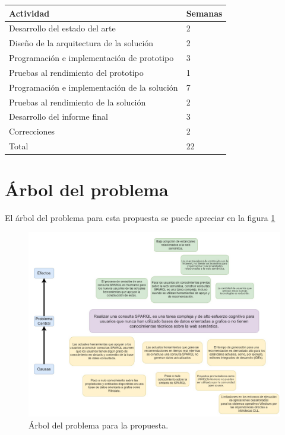 \documentclass[conference,compsoc]{IEEEtran}
\begin{document}
\begin{table}[h]
    \centering
    \begin{tabular}{|l|l|}
        \hline
        Actividad                                    & Semanas \\ \hline
        Desarrollo del estado del arte               & 2       \\ \hline
        Diseño de la arquitectura de la solución     & 2       \\ \hline
        Programación e implementación de prototipo   & 3       \\ \hline
        Pruebas al rendimiento del prototipo         & 1       \\ \hline
        Programación e implementación de la solución & 7       \\ \hline
        Pruebas al rendimiento de la solución        & 2       \\ \hline
        Desarrollo del informe final                 & 3       \\ \hline
        Correcciones                                 & 2       \\ \hline
        Total                                        & 22      \\ \hline
    \end{tabular}
\end{table}





\newpage
\onecolumn
\appendices
{}


\section{Árbol del problema}

El árbol del problema para esta propuesta se puede apreciar en la figura
\ref{fig:arbol-prob}

\begin{figure}[htbp]
    \label{fig:arbol-prob}
    \centering
    \includegraphics[width=\textwidth]{arbol}
    \caption{Árbol del problema para la propuesta.}
\end{figure}
\end{document}
